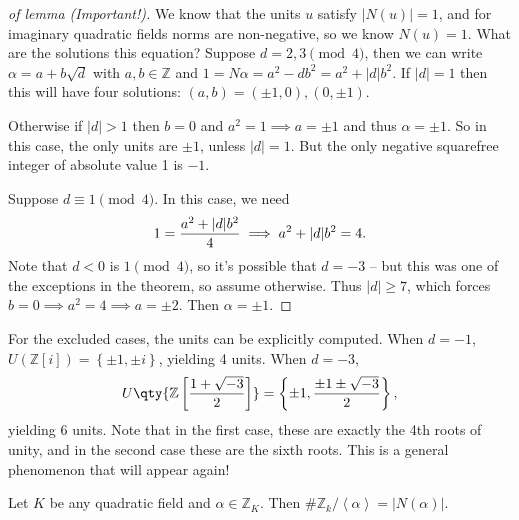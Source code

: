 \begin{proof}[of lemma (Important!)]

We know that the units \(u\) satisfy
\({\left\lvert {N(u)} \right\rvert} = 1\), and for imaginary quadratic
fields norms are non-negative, so we know \(N(u) = 1\). What are the
solutions this equation? Suppose \(d=2,3 \pmod 4\), then we can write
\(\alpha = a + b \sqrt{d}\) with \(a,b\in {\mathbb{Z}}\) and
\(1 = N \alpha = a^2 - db^2 = a^2 + {\left\lvert {d} \right\rvert}b^2\).
If \({\left\lvert {d} \right\rvert}= 1\) then this will have four
solutions: \((a, b) = (\pm 1, 0), (0, \pm 1)\).

\hfill\break

Otherwise if \({\left\lvert {d} \right\rvert}> 1\) then \(b=0\) and
\(a^2=1 \implies a = \pm 1\) and thus \(\alpha = \pm 1\). So in this
case, the only units are \(\pm 1\), unless
\({\left\lvert {d} \right\rvert} = 1\). But the only negative squarefree
integer of absolute value 1 is \(-1\).

Suppose \(d \equiv 1 \pmod 4\). In this case, we need
\begin{align*}
1 = {a^2 + {\left\lvert {d} \right\rvert} b^2 \over 4} \implies a^2 + {\left\lvert {d} \right\rvert}b^2 = 4  
.\end{align*}
Note that \(d<0\) is \(1\pmod 4\), so it's possible that \(d=-3\) -- but
this was one of the exceptions in the theorem, so assume otherwise. Thus
\({\left\lvert {d} \right\rvert}\geq 7\), which forces
\(b=0 \implies a^2 = 4 \implies a = \pm 2\). Then \(\alpha= \pm 1\).

\end{proof}

\begin{remark}

For the excluded cases, the units can be explicitly computed. When
\(d=-1\), \(U({\mathbb{Z}}[i]) =\left\{{\pm 1, \pm i}\right\}\),
yielding 4 units. When \(d=-3\),
\begin{align*}
U\qty{{\mathbb{Z}}\left[ {1 + \sqrt{-3} \over 2 } \right]} = \left\{{\pm 1, {\pm 1 \pm \sqrt{-3} \over 2}}\right\}
,\end{align*}
yielding 6 units. Note that in the first case, these are exactly the 4th
roots of unity, and in the second case these are the sixth roots. This
is a general phenomenon that will appear again!

\end{remark}

\begin{lemma}[?]

Let \(K\) be any quadratic field and \(\alpha\in {\mathbb{Z}}_K\). Then
\(\# {\mathbb{Z}}_k / \left\langle{ \alpha }\right\rangle = {\left\lvert {N( \alpha )} \right\rvert}\).

\end{lemma}

